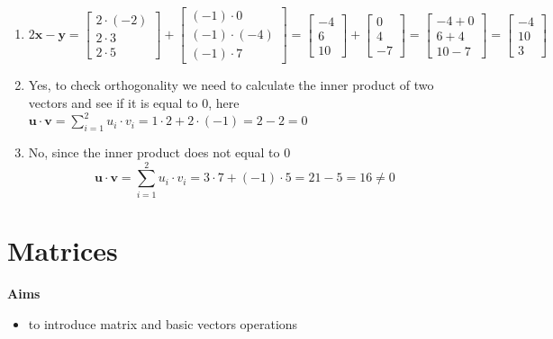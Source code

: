 \documentclass[
]{book}
\providecommand{\tightlist}{%
  \setlength{\itemsep}{0pt}\setlength{\parskip}{0pt}}
\theoremstyle{definition}
\theoremstyle{definition}
\theoremstyle{definition}
\theoremstyle{remark}
\begin{document}
\begin{enumerate}
\def\labelenumi{\alph{enumi})}
\setcounter{enumi}{1}
\item
  \[2\mathbf{x} - \mathbf{y} = \begin{bmatrix} 2 \cdot (-2) \\ 2 \cdot 3 \\ 2 \cdot 5 \end{bmatrix} + \begin{bmatrix} (-1) \cdot 0 \\ (-1) \cdot (-4) \\ (-1) \cdot 7 \end{bmatrix} = \begin{bmatrix} -4 \\ 6 \\ 10 \end{bmatrix}  + \begin{bmatrix} 0 \\ 4 \\ -7 \end{bmatrix}  = \begin{bmatrix} -4 + 0 \\ 6 + 4 \\ 10 - 7 \end{bmatrix} = \begin{bmatrix} -4 \\ 10 \\ 3 \end{bmatrix}\]
\item
  Yes, to check orthogonality we need to calculate the inner product of two vectors and see if it is equal to 0, here
  \(\mathbf{u} \cdot \mathbf{v} =\displaystyle\sum_{i=1}^{2}u_i\cdot v_i = 1 \cdot 2 + 2 \cdot (-1) = 2 - 2 = 0\)
\item
  No, since the inner product does not equal to 0 \[\mathbf{u} \cdot \mathbf{v} =\displaystyle\sum_{i=1}^{2}u_i\cdot v_i = 3 \cdot 7 + (-1) \cdot 5 = 21 - 5 = 16 \neq 0\]
\end{enumerate}

\hypertarget{matrices}{%
\chapter{Matrices}\label{matrices}}

\textbf{Aims}

\begin{itemize}
\tightlist
\item
  to introduce matrix and basic vectors operations
\end{itemize}
\end{document}
